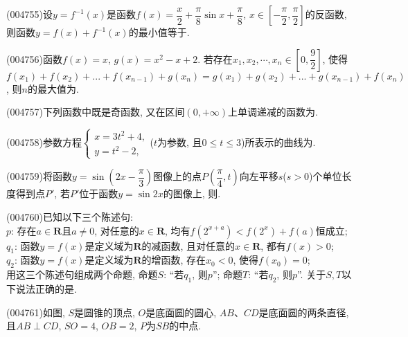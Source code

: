 \item (004755)设$y=f^{-1}(x)$是函数$f(x)=\dfrac x2+\dfrac{\pi}8\sin x+\dfrac{\pi}8$, $x\in [-\dfrac{\pi }2,\dfrac{\pi }2]$的反函数, 则函数$y=f(x)+f^{-1}(x)$的最小值等于.
\item (004756)函数$f(x)=x$, $g(x)=x^2-x+2$. 若存在$x_1, x_2,\cdots,x_n\in [0,\dfrac 92]$, 使得$f(x_1)+f(x_2)+...+f(x_{n-1})+g(x_n)=g(x_1)+g(x_2)+...+g(x_{n-1})+f(x_n)$, 则$n$的最大值为.
\item (004757)下列函数中既是奇函数, 又在区间$(0,+\infty)$上单调递减的函数为.
\item (004758)参数方程$\begin{cases} x=3t^2+4,\\ y=t^2-2, \end{cases}$($t$为参数, 且$0\le t\le 3$)所表示的曲线为.
\item (004759)将函数$y=\sin (2x-\dfrac{\pi}3)$图像上的点$P(\dfrac{\pi}4,t)$向左平移$s$($s>0$)个单位长度得到点$P'$, 若$P'$位于函数$y=\sin 2x$的图像上, 则.
\item (004760)已知以下三个陈述句:\\
$p$: 存在$a\in \mathbf{R}$且$a\ne 0$, 对任意的$x\in \mathbf{R}$, 均有$f(2^{x+a})<f(2^x)+f(a)$恒成立;\\
$q_1$: 函数$y=f(x)$是定义域为$\mathbf{R}$的减函数, 且对任意的$x\in \mathbf{R}$, 都有$f(x)>0$;\\
$q_2$: 函数$y=f(x)$是定义域为$\mathbf{R}$的增函数, 存在$x_0<0$, 使得$f(x_0)=0$;\\
用这三个陈述句组成两个命题, 命题$S$: ``若$q_1$, 则$p$''; 命题$T$: ``若$q_2$, 则$p$''. 关于$S,T$以下说法正确的是.
\item (004761)如图, $S$是圆锥的顶点, $O$是底面圆的圆心, $AB$、$CD$是底面圆的两条直径, 且$AB\perp CD$, $SO=4$, $OB=2$, $P$为$SB$的中点.
\begin{center}
\end{center}

